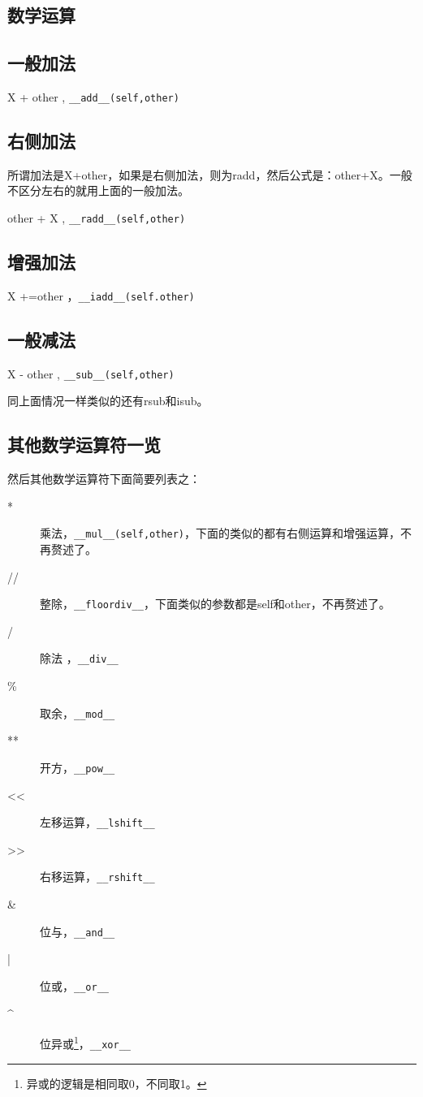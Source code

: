 \documentclass[12pt,oneside]{book}
\begin{document}
\begin{common-format}
\section{数学运算}
\subsection{一般加法}
X + other , \verb+__add__(self,other)+

\subsection{右侧加法}
所谓加法是X+other，如果是右侧加法，则为radd，然后公式是：other+X。一般不区分左右的就用上面的一般加法。

other + X , \verb+__radd__(self,other)+
\subsection{增强加法}
X +=other ，\verb+__iadd__(self.other)+

\subsection{一般减法}
X - other , \verb+__sub__(self,other)+

同上面情况一样类似的还有rsub和isub。

\subsection{其他数学运算符一览}
然后其他数学运算符下面简要列表之：
\begin{description}
\item[*] 乘法，\verb+__mul__(self,other)+，下面的类似的都有右侧运算和增强运算，不再赘述了。
\item[//] 整除，\verb+__floordiv__+，下面类似的参数都是self和other，不再赘述了。
\item[/] 除法 ，\verb+__div__+
\item[\%{}] 取余，\verb+__mod__+
\item[**] 开方，\verb+__pow__+
\item[<<] 左移运算，\verb+__lshift__+
\item[>>] 右移运算，\verb+__rshift__+
\item[\&{}] 位与，\verb+__and__+
\item[|] 位或，\verb+__or__+
\item[\^{}] 位异或\footnote{异或的逻辑是相同取0，不同取1。}，\verb+__xor__+
\end{description}


\end{common-format}
\end{document}
